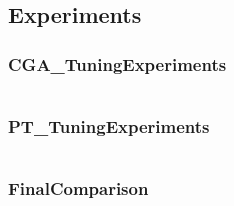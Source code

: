 \documentclass[10pt]{article}
\begin{document}
\subsection{Experiments}
\label{sec:experiments}
\subsubsection{CGA\_TuningExperiments}
\label{sec:CGA_TuningExperiments}
\begin{lstlisting}[language=Python, caption=CGA\_TuningExperiments.py, label=CGA_TuningExperimentspy]
\end{lstlisting}
\subsubsection{PT\_TuningExperiments}
\label{sec:PT_TuningExperiments}
\begin{lstlisting}[language=Python, caption=PT\_TuningExperiments.py, label=PT_TuningExperimentspy]
\end{lstlisting}
\subsubsection{FinalComparison}
\label{sec:FinalComparison}
\begin{lstlisting}[language=Python, caption=FinalComparison.py, label=FinalComparisonpy]
\end{lstlisting}
\end{document}
